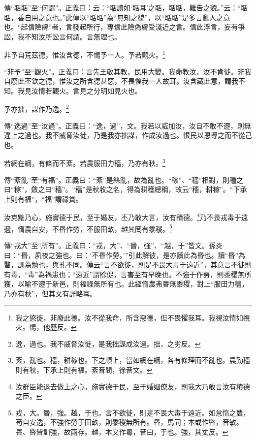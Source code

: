 {\noindent\zhuan{}\fzbyks 傳“聒聒”至“何謂”。正義曰：云：“聒讀如‘聒耳’之聒，聒聒，難告之貌。”云：“聒聒，善自用之意也。”此傳以“聒聒”為“無知之貌”，以“聒聒”是多言亂人之意也。“起信險膚”者，言發起所行，專信此險偽膚受淺近之言。信此浮言，妄有爭訟，我不知汝所訟言何謂。言無理也。 \par}

非予自荒茲德，惟汝含德，不惕予一人。予若觀火。\footnote{我之慾徙，非廢此德。汝不從我命，所含惡德，但不畏懼我耳。我視汝情如視火。惕，他歷反。}

{\noindent\shu{}\fzkt “非予”至“觀火”。正義曰：言先王敬其教，民用大變。我命教汝，汝不肯徙。非我自廢此丕欽之德，惟汝之所含德甚惡，不畏懼我一人故耳。汝含藏此意，謂我不知。我見汝情若觀火。言見之分明如見火也。 \par}

予亦拙，謀作乃逸。\footnote{逸，過也。我不威脅汝徙，是我拙謀成汝過。拙，之劣反。}

{\noindent\zhuan{}\fzbyks 傳“逸過”至“汝過”。正義曰：“逸，過”，文。我若以威加汝，汝自不敢不遷，則無違上之過也。我不威脅汝徙，乃是我亦拙謀，作成汝過也。恨民以恩導之而不從己也。 \par}

若網在綱，有條而不紊。若農服田力穡，乃亦有秋。\footnote{紊，亂也。穡，耕稼也。下之順上，當如網在綱，各有條理而不亂也。農勤穡則有秋，下承上則有福。紊音問，徐音文。}

{\noindent\zhuan{}\fzbyks 傳“紊亂”至“有福”。正義曰：“紊”是絲亂，故為亂也。“稼”、“穡”相對，則種之曰“稼”，斂之曰“穡”。“穡”是秋收之名，得為耕穫總稱，故云“穡，耕稼”。“下承上則有福”，“福”謂祿賞。 \par}

汝克黜乃心，施實德于民，至于婚友，丕乃敢大言，汝有積德。\footnote{汝群臣能退去傲上之心，施實德于民，至于婚姻僚友，則我大乃敢言汝有積德之臣。}乃不畏戎毒于遠邇，惰農自安，不昬作勞，不服田畝，越其罔有黍稷。\footnote{戎，大。昬，強。越，于也。言不欲徙，則是不畏大毒于遠近。如怠惰之農，苟自安逸，不強作勞于田畝，則黍稷無所有。昬，馬同；本或作暋，音敏。昬、暋皆訓強，故兩存。越，本又作粵，音曰，于也。強，其丈反。}

{\noindent\zhuan{}\fzbyks 傳“戎大”至“所有”。正義曰：“戎，大”、“昬，強”、“越，于”皆文。孫炎曰：“昬，夙夜之強也。曰：‘不昬作勞。’”引此解彼，是亦讀此為昬也。讀“昬”為暋，訓為勉也，與孔不同。傳云“言不欲徙，則是不畏大毒于遠近”，其意言不徙則有毒，“毒”為禍患也；“遠近”謂賒促，言害至有早晚也。不強于作勞，則黍稷無所獲，以喻不遷于新邑，則福祿無所有也。此經惰農弗昬無黍稷，對上“服田力穡，乃亦有秋”，但其文有詳略耳。 \par}

